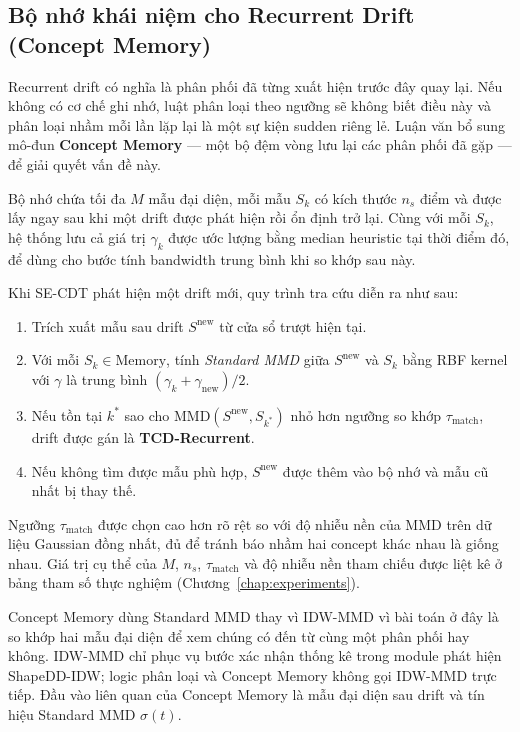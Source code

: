 \subsection{Bộ nhớ khái niệm cho Recurrent Drift (Concept Memory)}
\label{sec:se-cdt-concept-memory}

Recurrent drift có nghĩa là phân phối đã từng xuất hiện trước đây quay lại. Nếu không có cơ chế ghi nhớ, luật phân loại theo ngưỡng sẽ không biết điều này và phân loại nhầm mỗi lần lặp lại là một sự kiện sudden riêng lẻ. Luận văn bổ sung mô-đun \textbf{Concept Memory} --- một bộ đệm vòng lưu lại các phân phối đã gặp --- để giải quyết vấn đề này.

Bộ nhớ chứa tối đa $M$ mẫu đại diện, mỗi mẫu $S_k$ có kích thước $n_s$ điểm và được lấy ngay sau khi một drift được phát hiện rồi ổn định trở lại. Cùng với mỗi $S_k$, hệ thống lưu cả giá trị $\gamma_k$ được ước lượng bằng median heuristic tại thời điểm đó, để dùng cho bước tính bandwidth trung bình khi so khớp sau này.

Khi SE-CDT phát hiện một drift mới, quy trình tra cứu diễn ra như sau:
\begin{enumerate}
	\item Trích xuất mẫu sau drift $S^{\text{new}}$ từ cửa sổ trượt hiện tại.
	\item Với mỗi $S_k \in \text{Memory}$, tính \textit{Standard MMD} giữa $S^{\text{new}}$ và $S_k$ bằng RBF kernel với $\gamma$ là trung bình $(\gamma_k + \gamma_{\text{new}})/2$.
	\item Nếu tồn tại $k^\ast$ sao cho $\text{MMD}(S^{\text{new}}, S_{k^\ast})$ nhỏ hơn ngưỡng so khớp $\tau_{\text{match}}$, drift được gán là \textbf{TCD-Recurrent}.
	\item Nếu không tìm được mẫu phù hợp, $S^{\text{new}}$ được thêm vào bộ nhớ và mẫu cũ nhất bị thay thế.
\end{enumerate}

Ngưỡng $\tau_{\text{match}}$ được chọn cao hơn rõ rệt so với độ nhiễu nền của MMD trên dữ liệu Gaussian đồng nhất, đủ để tránh báo nhầm hai concept khác nhau là giống nhau. Giá trị cụ thể của $M$, $n_s$, $\tau_{\text{match}}$ và độ nhiễu nền tham chiếu được liệt kê ở bảng tham số thực nghiệm (Chương~\ref{chap:experiments}).

Concept Memory dùng Standard MMD thay vì IDW-MMD vì bài toán ở đây là so khớp hai mẫu đại diện để xem chúng có đến từ cùng một phân phối hay không. IDW-MMD chỉ phục vụ bước xác nhận thống kê trong module phát hiện ShapeDD-IDW; logic phân loại và Concept Memory không gọi IDW-MMD trực tiếp. Đầu vào liên quan của Concept Memory là mẫu đại diện sau drift và tín hiệu Standard MMD $\sigma(t)$.

